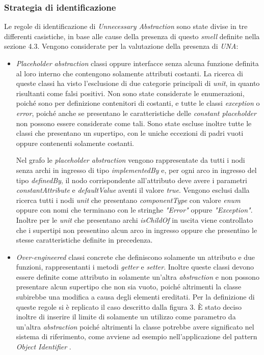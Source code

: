     
    
    \subsubsection{Strategia di identificazione}
        Le regole di identificazione di \textit{Unnecessary Abstraction} sono state divise in tre differenti casistiche, in base alle cause della presenza di questo \textit{smell} definite nella sezione 4.3. Vengono considerate per la valutazione della presenza di \textit{UNA}:
        \begin{itemize}
            \item \textit{Placeholder abstraction} classi oppure interfacce senza alcuna funzione definita al loro interno che contengono solamente attributi costanti. La ricerca di queste classi ha visto l'esclusione di due categorie principali di \textit{unit}, in quanto risultanti come falsi positivi. Non sono state considerate le enumerazioni, poiché sono per definizione contenitori di costanti, e tutte le classi \textit{exception} o \textit{error}, poiché anche se presentano le caratteristiche delle \textit{constant placeholder} non possono essere considerate come tali. Sono state escluse inoltre tutte le classi che presentano un supertipo, con le uniche eccezioni di  padri vuoti oppure contenenti solamente costanti.
            
            Nel grafo le \textit{placeholder abstraction} vengono rappresentate da tutti i nodi senza archi in ingresso di tipo \textit{implementedBy} e, per ogni arco in ingresso del tipo \textit{definedBy}, il nodo corrispondente all'attributo deve avere i parametri \textit{constantAttribute} e \textit{defaultValue} aventi il valore \textit{true}.
            Vengono esclusi dalla ricerca tutti i nodi \textit{unit} che presentano \textit{componentType} con valore \textit{enum} oppure con nomi che terminano con le stringhe \textit{"Error"} oppure \textit{"Exception"}. Inoltre per le \textit{unit} che presentano  archi \textit{isChildOf} in uscita viene controllato che i supertipi non presentino alcun arco in ingresso oppure che presentino le stesse caratteristiche definite in precedenza.
        
            
            \item \textit{Over-engineered} classi concrete che definiscono solamente un attributo e due funzioni, rappresentanti i metodi \textit{getter} e \textit{setter}. Inoltre queste classi devono essere definite come attributo in solamente un'altra \textit{abstraction} e non possono presentare alcun supertipo che non sia vuoto, poiché altrimenti la classe subirebbe una modifica a causa degli elementi ereditati. Per la definizione di queste regole si è replicato il caso descritto dalla figura 3. È stato deciso inoltre di inserire il limite di solamente un utilizzo come parametro da un'altra \textit{abstraction} poiché altrimenti la classe potrebbe avere significato nel sistema di riferimento, come avviene ad esempio nell'applicazione del pattern \textit{Object Identifier} \cite{brown1996pattern}. 
            

\end{itemize}
